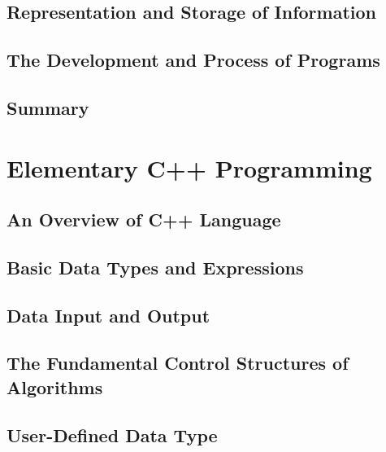 \documentclass[a4paper]{article}
\begin{document}
\subsection{Representation and Storage of Information}


\subsection{The Development and Process of Programs}


\subsection{Summary}



\newpage
\section{Elementary C++ Programming}
\subsection{An Overview of C++ Language}

\subsection{Basic Data Types and Expressions}

\subsection{Data Input and Output}

\subsection{The Fundamental Control Structures of Algorithms}

\subsection{User-Defined Data Type}
\end{document}
